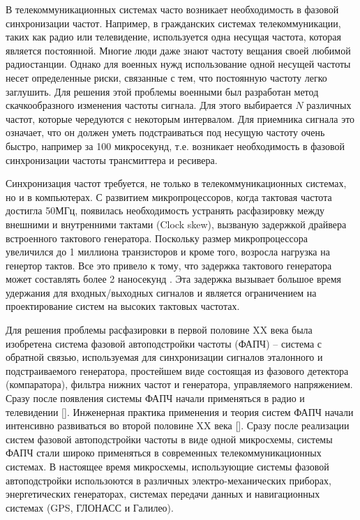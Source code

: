 \documentclass[a4paper,14pt]{extarticle} %
\begin{document}
В телекоммуникационных системах часто возникает необходимость в фазовой синхронизации частот. Например, в гражданских системах телекоммуникации, таких как радио или телевидение, используется одна несущая частота, которая является постоянной. Многие люди даже знают частоту вещания своей любимой радиостанции. Однако для военных нужд использование одной несущей частоты несет определенные риски, связанные с тем, что постоянную частоту легко заглушить. Для решения этой проблемы военными был разработан метод скачкообразного изменения частоты сигнала. Для этого выбирается $N$ различных частот, которые чередуются с некоторым интервалом. Для приемника сигнала это означает, что он должен уметь подстраиваться под несущую частоту очень быстро, например за 100 микросекунд, т.е. возникает необходимость в фазовой синхронизации частоты трансмиттера и ресивера. 

Синхронизация частот требуется, не только в телекоммуникационных системах, но и в компьютерах. С развитием микропроцессоров, когда тактовая частота достигла 50МГц, появилась необходимость устранять расфазировку между внешними и внутренними тактами (Clock skew), вызваную задержкой драйвера встроенного тактового генератора. Поскольку размер микропроцессора увеличился до 1 миллиона транзисторов и кроме того, возросла нагрузка на генертор тактов. Все это привело к тому, что задержка тактового генератора может составлять более 2 наносекунд \cite{Microprocessors}. Эта задержка вызывает большое время удержания для входных/выходных сигналов и является ограничением на проектирование систем на высоких тактовых частотах.
 
Для решения проблемы расфазировки в первой половине XX века была изобретена система фазовой автоподстройки частоты (ФАПЧ) -- система с обратной связью, используемая для синхронизации сигналов эталонного и подстраиваемого генератора, простейшем виде состоящая из фазового детектора (компаратора), фильтра нижних частот и генератора, управляемого напряжением. Сразу после появления системы ФАПЧ начали применяться в радио и телевидении []. Инженерная практика применения и теория систем ФАПЧ начали интенсивно развиваться во второй половине XX века []. Сразу после реализации систем фазовой автоподстройки частоты в виде одной микросхемы, системы ФАПЧ стали широко применяться в современных телекоммуникационных системах. В настоящее время микросхемы, использующие системы фазовой автоподстройки использоются в различных электро-механических приборах, энергетических генераторах, системах передачи данных и навигационных системах (GPS, ГЛОНАСС и Галилео).
\end{document}
